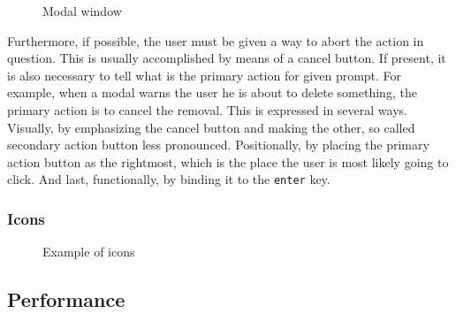 \documentclass[thesis=M,english,hidelinks]{FITthesis}[2012/10/20]
\newcommand{\code}{\texttt}
\begin{document}
\begin{figure}
  \setlength\fboxsep{0pt}
  \setlength\fboxrule{0.2pt}
  \caption{Modal window}
  \label{fig:modal}
\end{figure}

Furthermore, if possible, the user must be given a way to abort the action in question. This is usually accomplished by means of a cancel button. If present, it is also necessary to tell what is the primary action for given prompt. For example, when a modal warns the user he is about to delete something, the primary action is to cancel the removal. This is expressed in several ways. Visually, by emphasizing the cancel button and making the other, so called secondary action button less pronounced. Positionally, by placing the primary action button as the rightmost, which is the place the user is most likely going to click. And last, functionally, by binding it to the \code{enter} key.

    \subsubsection{Icons}

\begin{figure}[H]
  \setlength\fboxsep{0pt}
  \setlength\fboxrule{0.2pt}
  \caption{Example of icons}
  \label{fig:icons}
\end{figure}

  \subsection{Performance}
\end{document}
